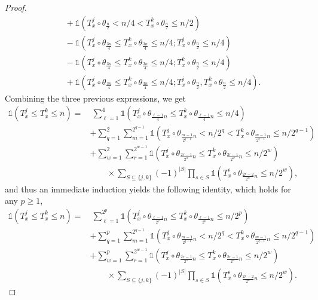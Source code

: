 \documentclass[12pt]{article}
\newcommand{\1}{\mathds{1}}
\numberwithin{equation}{section}
\begin{document}
\begin{proof}
\begin{align*}
        &\hspace{1em}+\1\left(T_x^j\circ\theta_{\frac n2}<n/4<T_x^k\circ\theta_{\frac n2}\le n/2\right)\\
        &\hspace{1em}-\1\left(T_x^j\circ\theta_{\frac {3n}4}\le T_x^k\circ\theta_{\frac{3n}4}\le n/4; T_x^j\circ\theta_{\frac n2}\le n/4\right)\\
        &\hspace{1em}-\1\left(T_x^j\circ\theta_{\frac{3n}4}\le T_x^k\circ\theta_{\frac{3n}4}\le n/4; T_x^k\circ\theta_{\frac n2}\le n/4\right)\\
        &\hspace{1em}+\1\left(T_x^j\circ\theta_{\frac{3n}4}\le T_x^k\circ\theta_{\frac{3n}4}\le n/4; T_x^j\circ\theta_{\frac n2},T_x^k\circ\theta_{\frac n2}\le n/4\right).
    \end{align*}
    Combining the three previous expressions, we get
    \begin{align*}
        \1\left(T_x^j\le T_x^k\le n\right)=&\ \sum_{\ell=1}^{4}\1\left(T_x^j\circ\theta_{\frac{\ell-1}{4}n}\le T_x^k\circ\theta_{\frac{\ell-1}{4}n}\le n/4\right)\\
        &+\sum_{q=1}^2\sum_{m=1}^{2^{q-1}}\1\left(T_x^j\circ\theta_{\frac{m-1}{2^{q-1}}n}<n/2^q<T_x^k\circ\theta_{\frac{m-1}{2^{q-1}}n}\le n/2^{q-1}\right)\\
        &+\sum_{w=1}^2\sum_{r=1}^{2^{w-1}}\1\left(T_x^j\circ \theta_{\frac{2r-1}{2^w}n}\le T_x^k\circ\theta_{\frac{2r-1}{2^w}n}\le n/2^w\right)\\
        &\quad\quad\times\sum_{S\subseteq\{j,k\}}(-1)^{|S|}\prod_{s\in S}\1\left(T_x^s\circ\theta_{\frac{2r-2}{2^w}n}\le n/2^w\right),
    \end{align*}
    and thus an immediate induction yields the following identity, which holds for any $p\ge1$,
    \begin{align*}
        \1\left(T_x^j\le T_x^k\le n\right)=&\ \sum_{\ell=1}^{2^p}\1\left(T_x^j\circ\theta_{\frac{\ell-1}{2^p}n}\le T_x^k\circ\theta_{\frac{\ell-1}{2^p}n}\le n/2^p\right)\\
        &+\sum_{q=1}^p\sum_{m=1}^{2^{q-1}}\1\left(T_x^j\circ\theta_{\frac{m-1}{2^{q-1}}n}<n/2^q<T_x^k\circ\theta_{\frac{m-1}{2^{q-1}}n}\le n/2^{q-1}\right)\\
        &+\sum_{w=1}^p\sum_{r=1}^{2^{w-1}}\1\left(T_x^j\circ \theta_{\frac{2r-1}{2^w}n}\le T_x^k\circ\theta_{\frac{2r-1}{2^w}n}\le n/2^w\right)\\
        &\quad\quad\times\sum_{S\subseteq\{j,k\}}(-1)^{|S|}\prod_{s\in S}\1\left(T_x^s\circ\theta_{\frac{2r-2}{2^w}n}\le n/2^w\right).

\end{align*}
\end{proof}
\end{document}
